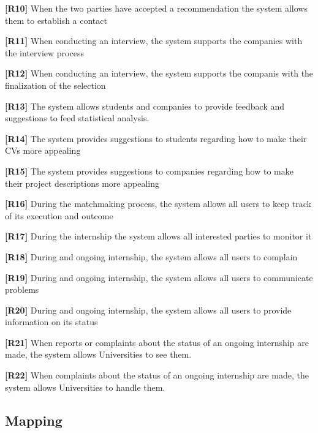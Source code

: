 \textbf{[R10] }  When the two parties have accepted a recommendation the system allows them to establish a contact

\textbf{[R11]} When conducting an interview, the system supports the companies with the interview process

\textbf{[R12]} When conducting an interview, the system supports the companis with the finalization of the selection

\textbf{[R13]} The system allows students and companies to provide feedback and suggestions to feed statistical analysis.

\textbf{[R14] }The system provides suggestions to students regarding how to make their CVs more appealing

\textbf{[R15]} The system provides suggestions to companies regarding how to make their project descriptions more appealing

\textbf{[R16]} During the matchmaking process, the system allows all users to keep track of its execution and outcome

\textbf{[R17]} During the internship the system allows all interested parties to monitor it

\textbf{[R18]} During and ongoing internship, the system allows all users to complain 

\textbf{[R19]} During and ongoing internship, the system allows all users to communicate problems 

\textbf{[R20]} During and ongoing internship, the system allows all users to provide information on its status

\textbf{[R21]} When reports or complaints about the status of an ongoing internship are made, the system allows Universities to see them.

\textbf{[R22]} When complaints about the status of an ongoing internship are made, the system allows Universities to handle them.



\subsection{Mapping}



